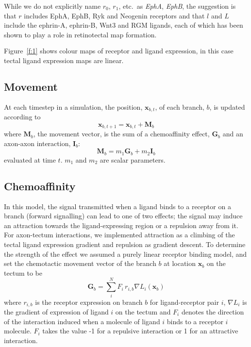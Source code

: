 \documentclass[11pt, a4paper]{article}
\begin{document}
While we do not explicitly name $r_0$, $r_1$,
etc.~as \emph{EphA}, \emph{EphB}, the suggestion is that $r$ includes EphA,
EphB, Ryk \citep{schmitt_wntryk_2006} and
Neogenin \citep{rajagopalan_neogenin_2004} receptors and that $l$ and $L$
include the ephrin-A, ephrin-B, Wnt3 \citep{schmitt_wntryk_2006} and
RGM \citep{monnier_rgm_2002} ligands, each of which has been shown to play a
role in retinotectal map formation.

Figure~\ref{f:1} shows colour maps of receptor and ligand
expression, in this case tectal ligand expression maps are linear.

\subsection*{Movement}

At each timestep in a simulation, the position, $\mathbf{x}_{b,t}$, of each
branch, $b$, is updated according to
%
\begin{equation}
\mathbf{x}_{b,t+1} = \mathbf{x}_{b,t} + \mathbf{M}_{b}
\end{equation}
%
where $\mathbf{M}_{b}$, the movement vector, is the sum of a chemoaffinity
effect, $\mathbf{G}_b$ and an axon-axon interaction, $\mathbf{I}_b$:
%
\begin{equation}
\mathbf{M}_{b} = m_1 \mathbf{G}_b + m_2 \mathbf{I}_b
\end{equation}
%
evaluated at time $t$. $m_1$ and $m_2$ are scalar parameters.

\subsection*{Chemoaffinity}

In this model, the signal transmitted when a ligand binds to a receptor on a
branch (forward signalling) can lead to one of two effects; the signal may
induce an attraction towards the ligand-expressing region or a repulsion away
from it.
%
For axon-tectum interactions, we implemented attraction as a climbing of the
tectal ligand expression gradient and repulsion as gradient descent.
%
To determine the strength of the effect we assumed a purely linear receptor
binding model, and set the chemotactic movement vector of the branch $b$ at
location $\mathbf{x}_b$ on the tectum to be
%
\begin{equation}
\mathbf{G}_b = \sum_i^N F_i\,r_{i,b} \nabla L_i(\mathbf{x}_b)
\end{equation}
%
where $r_{i,b}$ is the receptor expression on branch $b$ for ligand-receptor
pair $i$, $\nabla L_i$ is the gradient of expression of ligand $i$ on the
tectum and $F_i$ denotes the direction of the interaction induced when a
molecule of ligand $i$ binds to a receptor $i$ molecule. $F_i$ takes the value
-1 for a repulsive interaction or 1 for an attractive interaction.
\end{document}
